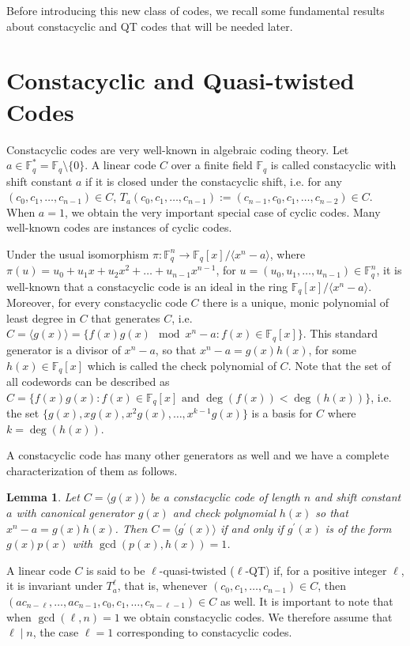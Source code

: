 \documentclass[preprint,12pt]{elsarticle}
\newtheorem{Lemma}[Theorem]{Lemma}
\newcommand{\Fq}{\mathbb{F}_q}
\begin{document}
Before introducing this new class of codes, we recall some fundamental  results about constacyclic and QT codes that will be needed later.

\section{Constacyclic and Quasi-twisted Codes}

Constacyclic codes are very well-known in algebraic coding theory. Let $a\in \Fq^{*}=\Fq\setminus \{0\}$. A
linear code $C$ over a finite field $\Fq$ is called constacyclic with shift constant $a$ if it is closed under
the constacyclic shift, i.e. for any $(c_0, c_1, \ldots, c_{n-1})\in C$, $T_a(c_0, c_1, \ldots, c_{n-1}) :=
(c_{n-1}, c_0, c_1, \ldots, c_{n-2})\in C$.  When $a=1$, we obtain the very important special case of  cyclic codes. Many well-known  codes are instances of cyclic codes.

Under the usual  isomorphism $\pi : \Fq^n \to \Fq[x] / \langle x^n - a\rangle$, where $\pi(u) = u_0 + u_1 x + u_2 x^2 + \ldots + u_{n-1}
x^{n-1}$, for $u=(u_0,u_1,\dots,u_{n-1}) \in \Fq^n$, it is
well-known that a constacyclic code is an ideal in the ring $\Fq[x]/ \langle x^n-a \rangle$. Moreover, for every constacyclic code $C$ there is a unique, monic polynomial of least degree in $C$ that generates $C$, i.e. 
$C=\langle g(x)\rangle=\{ f(x)g(x)\mod x^n-a: f(x)\in \Fq[x] \}$. This standard generator is a divisor of $x^n-a$, so that $x^n-a=g(x)h(x)$, for some $h(x)\in \Fq[x]$ which is called the check polynomial of $C$. 
Note that the set of all codewords can be described as
 $C=\{ f(x)g(x): f(x)\in \mathbb{F}_q[x] \text{ and } \deg(f(x))<\deg(h(x)) \}$, i.e. the set $\{ g(x),xg(x),x^2g(x),\dots,x^{k-1}g(x) \}$ is a basis for $C$ where $k=\deg(h(x))$.  

A constacyclic code has many other generators as well and we have a complete characterization of them  as follows.

\begin{Lemma} \cite{qtmain}  Let $C=\langle g(x)\rangle$ be a constacyclic code of length $n$ and shift constant $a$ with canonical generator $g(x)$ and check polynomial $h(x)$ so that $x^n-a=g(x)h(x)$. Then $C=\langle g^{\prime}(x)\rangle$ if and only if $g^{\prime}(x)$ is of the form $g(x)p(x)$ with $\gcd(p(x),h(x))=1$.
\end{Lemma}

A linear code $C$ is said to be $\ell$-quasi-twisted ($\ell$-QT) if, for a
positive integer $\ell$, it is invariant under $T_a ^{\ell}$, that is, whenever $(c_0,c_1,\dots,c_{n-1})\in C$,
then $(ac_{n-\ell},\dots,ac_{n-1},c_0,c_1,\dots,c_{n-\ell-1})\in
C$ as well. It is important to note that when $\gcd(\ell,n)=1$ we obtain
constacyclic codes. We  therefore assume that $\ell\mid n$, the
case $\ell=1$ corresponding to constacyclic codes.
\end{document}
